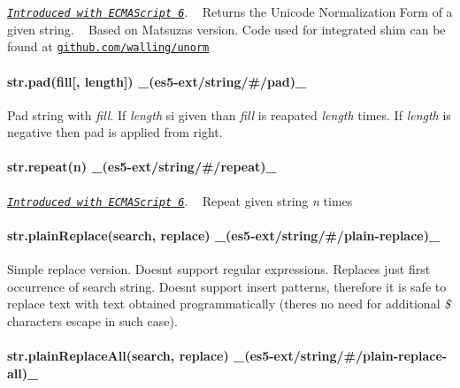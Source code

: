 \href{https://developer.mozilla.org/en-US/docs/Web/JavaScript/Reference/Global_Objects/String/normalize}{\tt {\itshape Introduced with E\+C\+M\+A\+Script 6}}. ~\newline
Returns the Unicode Normalization Form of a given string. ~\newline
Based on Matsuza\textquotesingle{}s version. Code used for integrated shim can be found at \href{https://github.com/walling/unorm/blob/master/lib/unorm.js}{\tt github.\+com/walling/unorm}

\paragraph*{str.\+pad(fill\mbox{[}, length\mbox{]}) \+\_\+(es5-\/ext/string/\#/pad)\+\_\+}

Pad string with {\itshape fill}. If {\itshape length} si given than {\itshape fill} is reapated {\itshape length} times. If {\itshape length} is negative then pad is applied from right.

\paragraph*{str.\+repeat(n) \+\_\+(es5-\/ext/string/\#/repeat)\+\_\+}

\href{http://people.mozilla.org/~jorendorff/es6-draft.html#sec-string.prototype.repeat}{\tt {\itshape Introduced with E\+C\+M\+A\+Script 6}}. ~\newline
Repeat given string {\itshape n} times

\paragraph*{str.\+plain\+Replace(search, replace) \+\_\+(es5-\/ext/string/\#/plain-\/replace)\+\_\+}

Simple {\ttfamily replace} version. Doesn\textquotesingle{}t support regular expressions. Replaces just first occurrence of search string. Doesn\textquotesingle{}t support insert patterns, therefore it is safe to replace text with text obtained programmatically (there\textquotesingle{}s no need for additional {\itshape \$} characters escape in such case).

\paragraph*{str.\+plain\+Replace\+All(search, replace) \+\_\+(es5-\/ext/string/\#/plain-\/replace-\/all)\+\_\+}

